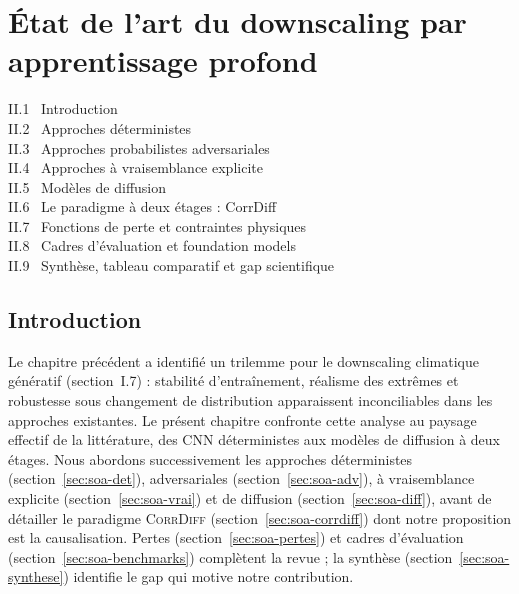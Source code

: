 \documentclass[14pt,a4paper,openany]{extreport}
\newcommand{\CorrDiff}{\textsc{CorrDiff}}
\begin{document}
\chapter{État de l'art du downscaling par apprentissage profond}
\label{chap:etatdelart}

\begin{sommairebox}
\small
\noindent II.1 \ Introduction \dotfill \pageref{sec:soa-intro}\\
\noindent II.2 \ Approches déterministes \dotfill \pageref{sec:soa-det}\\
\noindent II.3 \ Approches probabilistes adversariales \dotfill \pageref{sec:soa-adv}\\
\noindent II.4 \ Approches à vraisemblance explicite \dotfill \pageref{sec:soa-vrai}\\
\noindent II.5 \ Modèles de diffusion \dotfill \pageref{sec:soa-diff}\\
\noindent II.6 \ Le paradigme à deux étages : CorrDiff \dotfill \pageref{sec:soa-corrdiff}\\
\noindent II.7 \ Fonctions de perte et contraintes physiques \dotfill \pageref{sec:soa-pertes}\\
\noindent II.8 \ Cadres d'évaluation et foundation models \dotfill \pageref{sec:soa-benchmarks}\\
\noindent II.9 \ Synthèse, tableau comparatif et gap scientifique \dotfill \pageref{sec:soa-synthese}
\end{sommairebox}

\vspace{1.5em}

\section{Introduction}
\label{sec:soa-intro}

Le chapitre précédent a identifié un trilemme pour le downscaling climatique génératif (section~I.7) : stabilité d'entraînement, réalisme des extrêmes et robustesse sous changement de distribution apparaissent inconciliables dans les approches existantes. Le présent chapitre confronte cette analyse au paysage effectif de la littérature, des CNN déterministes aux modèles de diffusion à deux étages. Nous abordons successivement les approches déterministes (section~\ref{sec:soa-det}), adversariales (section~\ref{sec:soa-adv}), à vraisemblance explicite (section~\ref{sec:soa-vrai}) et de diffusion (section~\ref{sec:soa-diff}), avant de détailler le paradigme \CorrDiff{} (section~\ref{sec:soa-corrdiff}) dont notre proposition est la causalisation. Pertes (section~\ref{sec:soa-pertes}) et cadres d'évaluation (section~\ref{sec:soa-benchmarks}) complètent la revue ; la synthèse (section~\ref{sec:soa-synthese}) identifie le gap qui motive notre contribution.
\end{document}

